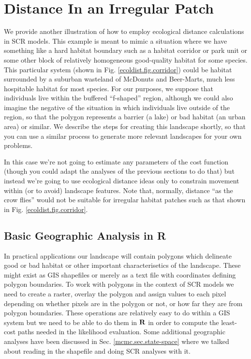 \section{Distance In an Irregular Patch}
\label{ecoldist.sec.buffer}

We provide another illustration of how to employ ecological distance
calculations in SCR models. This example is meant to mimic
a situation where we have something like a hard habitat boundary
such as a habitat corridor or park unit or some other block
of relatively homogeneous good-quality habitat for some species. This
particular system (shown in Fig. \ref{ecoldist.fig.corridor}) could
be habitat surrounded by a suburban wasteland of McDonuts and
Beer-Marts, much less hospitable habitat for most species.  For our
purposes, we suppose that individuals live within the buffered
``f-shaped''
region, although we could also imagine the negative of the
situation in which individuals live outside of the region, so that the
polygon represents a barrier (a lake) or bad habitat (an urban area)
or similar.  We describe the steps for creating this landscape
shortly, so that you can use a similar process to generate more
relevant landscapes for your own problems.

In this case we're not going to estimate any parameters of the cost
function (though you could adapt the analyses of the previous sections
to do that) but instead we're going to use ecological
distance ideas only to constrain movement within (or to avoid)
landscape features. Note that, normally, distance ``as the crow
flies'' would not be suitable for irregular habitat patches such as
that shown in Fig. \ref{ecoldist.fig.corridor}.


\subsection{Basic Geographic Analysis in R}

In practical applications our landscape will contain %
polygons which delineate good or bad habitat or other important
characterisetics of the landscape.  These might exist as GIS
shapefiles or merely as a text file with coordinates defining polygon
boundaries. To work with polygons in the context of SCR models we need
to create a raster, overlay the polygon and assign values to each pixel
depending on whether pixels are in the polygon or not, or how far they
are from polygon boundaries. These operations are relatively easy to
do within a GIS system but we need to be able to do them in ${\bf R}$
in order to compute the least-cost paths needed in the likelihood
evaluation. Some additional geographic analyses have been discussed in
Sec.
 \ref{mcmc.sec.state-space}
where we talked about reading in the shapefile and doing SCR analyses
with it.

